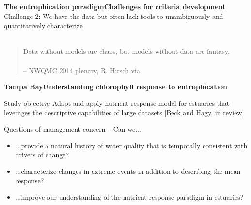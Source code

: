 \documentclass[serif]{beamer}\usepackage[]{graphicx}\usepackage[]{color}
\begin{document}
\begin{frame}{\textbf{The eutrophication paradigm}}{\textbf{Challenges for criteria development}}
\alert{Challenge 2:} We have the data but often lack tools to unambiguously and quantitatively characterize\\~\\
\vspace{0.2in}
\begin{quote}
Data without models are chaos, but models without data are fantasy. \\~\\
\vspace{0.05in}
\hspace{0.1in}-- NWQMC 2014 plenary, R. Hirsch via \cite{Nisbet14}
\end{quote}
\end{frame}

\begin{frame}{\textbf{Tampa Bay}}{\textbf{Understanding chlorophyll response to eutrophication}}
\begin{block}{Study objective}
Adapt and apply nutrient response model for estuaries that leverages the descriptive capabilities of large datasets \scriptsize [Beck and Hagy, in review]
\end{block}
\vspace{0.2in}
Questions of management concern -- Can we...
\begin{itemize}
\item ...provide a natural history of water quality that is temporally consistent with drivers of change?
\item ...characterize changes in extreme events in addition to describing the mean response?  
\item ...improve our understanding of the nutrient-response paradigm in estuaries?
\end{itemize}
\end{frame}

\end{document}
